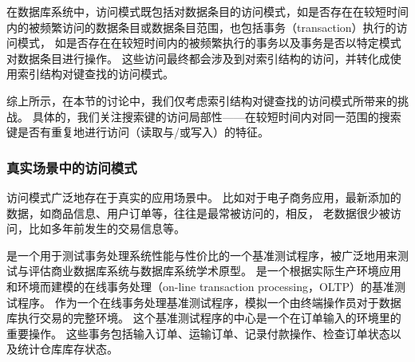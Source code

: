 
在数据库系统中，访问模式既包括对数据条目的访问模式，如是否存在在较短时间内的被频繁访问的数据条目或数据条目范围，也包括事务（transaction）执行的访问模式，
如是否存在在较短时间内的被频繁执行的事务以及事务是否以特定模式对数据条目进行操作。
这些访问最终都会涉及到对索引结构的访问，并转化成使用索引结构对键查找的访问模式。

综上所示，在本节的讨论中，我们仅考虑索引结构对键查找的访问模式所带来的挑战。
具体的，我们关注搜索键的访问局部性{------}在较短时间内对同一范围的搜索键是否有重复地进行访问（读取与/或写入）的特征。

\subsubsection{真实场景中的访问模式}

访问模式广泛地存在于真实的应用场景中。
比如对于电子商务应用，最新添加的数据，如商品信息、用户订单等，往往是最常被访问的，相反，
老数据很少被访问，比如多年前发生的交易信息等。

{\tpcc}是一个用于测试事务处理系统性能与性价比的一个基准测试程序，被广泛地用来测试与评估商业数据库系统与数据库系统学术原型。
{\tpcc}是一个根据实际生产环境应用和环境而建模的在线事务处理（on-line transaction processing，OLTP）的基准测试程序。
作为一个在线事务处理基准测试程序，{\tpcc}模拟一个由终端操作员对于数据库执行交易的完整环境。
这个基准测试程序的中心是一个在订单输入的环境里的重要操作。
这些事务包括输入订单、运输订单、记录付款操作、检查订单状态以及统计仓库库存状态。


